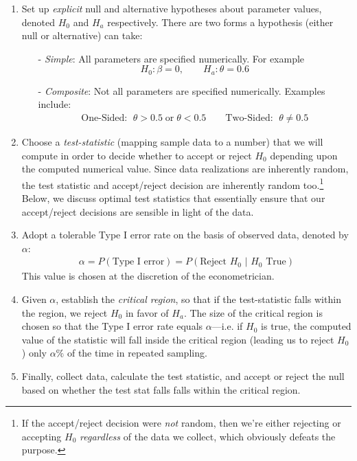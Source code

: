 \documentclass[12pt]{article}
\theoremstyle{plain}
\theoremstyle{definition}
\theoremstyle{remark}
\begin{document}
\begin{enumerate}
  \item
    Set up \emph{explicit} null and alternative hypotheses about
    parameter values, denoted $H_0$ and $H_a$ respectively.
    There are two forms a hypothesis (either null or alternative) can
    take:
    \begin{itemize}
      \item[-] {\sl Simple}: All parameters are specified
          numerically. For example
          \[ H_0: \beta = 0, \qquad H_a:\theta = 0.6\]
      \item[-] {\sl Composite}: Not all parameters are specified
          numerically. Examples include:
          \begin{align*}
            \text{One-Sided: } \;
            \theta > 0.5 \;\text{or} \; \theta < 0.5
            \qquad
            \text{Two-Sided: } \; \theta \neq 0.5
          \end{align*}
    \end{itemize}

  \item Choose a \emph{test-statistic} (mapping sample data to a number)
    that we will compute in order to decide whether to accept or
    reject $H_0$ depending upon the computed numerical value.
    Since data realizations are inherently random, the test statistic
    and accept/reject decision are inherently random too.\footnote{%
      If the accept/reject decision were \emph{not} random, then we're
      either rejecting or accepting $H_0$ \emph{regardless} of the data
      we collect, which obviously defeats the purpose.
    }
    Below, we discuss optimal test statistics that essentially ensure
    that our accept/reject decisions are sensible in light of the data.

  \item Adopt a tolerable Type I error rate on the basis of observed
    data, denoted by $\alpha$:
    \begin{align*}
      \alpha = P(\text{Type I error})
      = P(\text{Reject $H_0$ | $H_0$ True})
    \end{align*}
    This value is chosen at the discretion of the econometrician.

  \item Given $\alpha$, establish the \emph{critical region}, so that if
    the test-statistic falls within the region, we reject $H_0$ in favor
    of $H_a$. The size of the critical region is chosen so that the Type
    I error rate equals $\alpha$---i.e. if $H_0$ is true, the computed
    value of the statistic will fall inside the critical region (leading
    us to reject $H_0$) only $\alpha\%$ of the time in repeated
    sampling.

  \item Finally, collect data, calculate the test statistic, and accept
    or reject the null based on whether the test stat falls falls within
    the critical region.
\end{enumerate}
\end{document}
